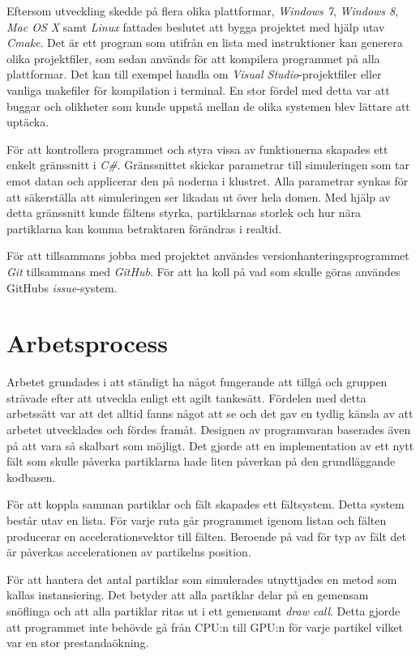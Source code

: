 \documentclass[12pt,a4paper]{article}
\begin{document}
	Eftersom utveckling skedde på flera olika plattformar, \emph{Windows 7}, \emph{Windows 8}, \emph{Mac OS X} samt \emph{Linux} fattades beslutet att bygga projektet med hjälp utav \emph{Cmake}. Det är ett program som utifrån en lista med instruktioner kan generera olika projektfiler, som sedan används för att kompilera programmet på alla plattformar. Det kan till exempel handla om \emph{Visual Studio}-projektfiler eller vanliga makefiler för kompilation i terminal. En stor fördel med detta var att buggar och olikheter som kunde uppstå mellan de olika systemen blev lättare att uptäcka.

	För att kontrollera programmet och styra vissa av funktionerna skapades ett enkelt gränssnitt i \emph{C\#}. Gränssnittet skickar parametrar till simuleringen som tar emot datan och applicerar den på noderna i klustret. Alla parametrar synkas för att säkerställa att simuleringen ser likadan ut över hela domen. Med hjälp av detta gränssnitt kunde fältens styrka, partiklarnas storlek och hur nära partiklarna kan komma betraktaren förändras i realtid.

	För att tillsammans jobba med projektet användes versionhanteringsprogrammet \emph{Git} tillsammans med \emph{GitHub}. För att ha koll på vad som skulle göras användes GitHubs \emph{issue}-system.

\section*{Arbetsprocess}
	Arbetet grundades i att ständigt ha något fungerande att tillgå och gruppen strävade efter att utveckla enligt ett agilt tankesätt. Fördelen med detta arbetssätt var att det alltid fanns något att se och det gav en tydlig känsla av att arbetet utvecklades och fördes framåt. Designen av programvaran baserades även på att vara så skalbart som möjligt. Det gjorde att en implementation av ett nytt fält som skulle påverka partiklarna hade liten påverkan på den grundläggande kodbasen.

	För att koppla samman partiklar och fält skapades ett fältsystem. Detta system består utav en lista. För varje ruta går programmet igenom listan och fälten producerar en accelerationsvektor till fälten. Beroende på vad för typ av fält det är påverkas accelerationen av partikelns position.

	För att hantera det antal partiklar som simulerades utnyttjades en metod som kallas instansiering. Det betyder att alla partiklar delar på en gemensam snöflinga och att alla partiklar ritas ut i ett gemensamt \emph{draw call}. Detta gjorde att programmet inte behövde gå från CPU:n till GPU:n för varje partikel vilket var en stor prestandaökning.
\end{document}
